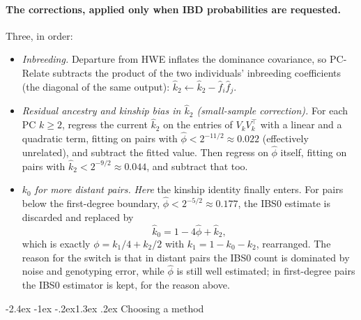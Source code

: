 \documentclass[10pt,a4paper]{article}
\makeatletter
\renewcommand\section{\@startsection{section}{1}{\z@}%
  {-2.4ex \@plus -1ex \@minus -.2ex}{1.3ex \@plus.2ex}%
  {\normalfont\large\bfseries\color{hdr}}}
\newenvironment{tightitem}{%
  \begin{itemize}\setlength{\itemsep}{1pt}\setlength{\parskip}{0pt}%
  \setlength{\topsep}{3pt}\setlength{\parsep}{0pt}}{\end{itemize}}
\makeatother
\begin{document}
\paragraph{The corrections, applied only when IBD probabilities are requested.} Three, in order:
\begin{tightitem}
  \item \emph{Inbreeding.} Departure from HWE inflates the dominance covariance, so PC-Relate subtracts the
  product of the two individuals' inbreeding coefficients (the diagonal of the same output):
  $\hat k_2 \leftarrow \hat k_2 - \hat f_i \hat f_j$.
  \item \emph{Residual ancestry and kinship bias in $\hat k_2$ (small-sample correction).} For each PC
  $k\ge 2$, regress the current $\hat k_2$ on the entries of $V_k V_k^{\!\top}$ with a linear and a quadratic
  term, fitting on pairs with $\hat\phi<2^{-11/2}\approx 0.022$ (effectively unrelated), and subtract the
  fitted value. Then regress on $\hat\phi$ itself, fitting on pairs with $\hat k_2<2^{-9/2}\approx 0.044$,
  and subtract that too.
  \item \emph{$k_0$ for more distant pairs.} \emph{Here} the kinship identity finally enters. For pairs below
  the first-degree boundary, $\hat\phi<2^{-5/2}\approx 0.177$, the IBS0 estimate is discarded and replaced by
  \begin{equation*}
  \hat k_0 = 1-4\hat\phi+\hat k_2,
  \end{equation*}
  which is exactly $\phi=k_1/4+k_2/2$ with $k_1=1-k_0-k_2$, rearranged. The reason for the switch is that in
  distant pairs the IBS0 count is dominated by noise and genotyping error, while $\hat\phi$ is still well
  estimated; in first-degree pairs the IBS0 estimator is kept, for the reason above.
\end{tightitem}

\section{Choosing a method}
\end{document}
